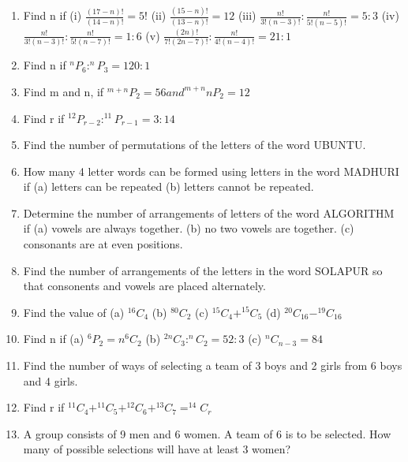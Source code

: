 \documentclass[14pt]{article}
\begin{document}
\begin{multicols}{2}
\begin{enumerate}[resume]
\item Find n if
(i) $\frac{(17-n)!}{(14-n)!}= 5!$
(ii) $\frac{(15-n)!}{(13-n)!}= 12$
(iii) $\frac{n!}{3!(n-3)!}:\frac{n!}{5!(n-5)!}=5:3$
(iv) $\frac{n!}{3!(n-3)!}:\frac{n!}{5!(n-7)!}=1:6$
(v) $\frac{(2n)!}{7!(2n-7)!}:\frac{n!}{4!(n-4)!}=21:1$ 

\item Find n if $^nP_6 : ^nP_3=120:1$

\item Find m and n, if $^{m+n}P_2 = 56 and ^{m+n}nP_2=12$

\item Find r if $^12P_{r-2} : ^11P_{r-1}=3:14$

\item Find the number of permutations of the
letters of the word UBUNTU.

\item How many 4 letter words can be formed
using letters in the word MADHURI if
(a) letters can be repeated (b) letters cannot
be repeated.



\item Determine the number of arrangements of
letters of the word ALGORITHM if
(a) vowels are always together.
(b) no two vowels are together.
(c) consonants are at even positions.

\item Find the number of arrangements of the letters
in the word SOLAPUR so that consonents
and vowels are placed alternately.

\item Find the value of  (a) $ ^{16}C_4 $
(b)  $ ^{80}C_2$
(c)  $ ^{15}C_4 + ^{15}C_5 $
(d)  $ ^{20}C_{16} - ^{19}C_{16} $

\item Find n if  (a) $ ^6P_2 = n ^6C_2 $
(b)  $ ^{2n}C_3 : ^nC_2 = 52:3$
(c)  $ ^nC_{n-3}=84$

\item Find the number of ways of selecting a team
of 3 boys and 2 girls from 6 boys and 4 girls.

\item Find r if  $ ^{11}C_4 + ^{11}C_5 + ^{12}C_6 +  ^{13}C_7=^{14}C_r$
 
 \item A group consists of 9 men and 6 women.
A team of 6 is to be selected. How many
of possible selections will have at least
3 women?
\end{enumerate} 





\end{multicols}
\end{document}
